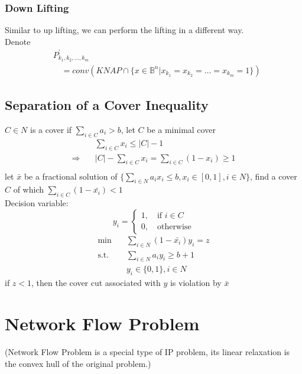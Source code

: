 			\subsection{Down Lifting}
				Similar to up lifting, we can perform the lifting in a different way.\\
				Denote
				\begin{align}
					&P_{k_1, k_2, ..., k_m}^{'} \\
					&\quad =conv(KNAP\cap \{x\in \mathbb{B}^{n}|x_{k_1}=x_{k_2}=\dots=x_{k_m}=1\}) 
				\end{align}

		\section{Separation of a Cover Inequality}
			$C\in N$ is a cover if $\sum_{i\in C} a_i > b$, let $C$ be a minimal cover
			\begin{align}
				&\sum_{i\in C}x_i \le |C| - 1 \\
				\Rightarrow \quad & |C| - \sum_{i\in C}x_i = \sum_{i \in C}(1-x_i)\ge 1 \\
			\end{align}
			let $\bar{x}$ be a fractional solution of $\{\sum_{i\in N} a_ix_i \le b, x_i \in [0, 1], i\in N\}$, find a cover $C$ of which $\sum_{i\in C}(1-\bar{x_i})<1$\\
			Decision variable:
			\begin{equation}
				y_i = \begin{cases}1, \quad \text{if } i\in C\\ 0, \quad \text{otherwise}\end{cases}
			\end{equation}
			\begin{align}
				\min \quad & \sum_{i\in N} (1-\bar{x_i})y_i = z \\
				\text{s.t.} \quad & \sum_{i\in N}a_iy_i \ge b+1 \\
				&y_i \in \{0, 1\}, i\in N
			\end{align}
			if $z<1$, then the cover cut associated with $y$ is violation by $\bar{x}$

	\chapter{Network Flow Problem}
		(Network Flow Problem is a special type of IP problem, its linear relaxation is the convex hull of the original problem.)
